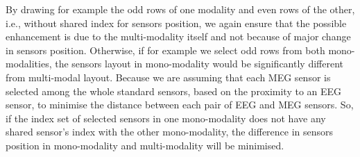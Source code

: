 By drawing for example the odd rows of one modality and even rows of the other, i.e., without shared index for sensors position, we again ensure that the possible enhancement is due to the multi-modality itself and not because of major change in sensors position.
Otherwise, if for example we select odd rows from both mono-modalities, the sensors layout in mono-modality would be significantly different from multi-modal layout.
Because we are assuming that each MEG sensor is selected among the whole standard sensors, based on the proximity to an EEG sensor, to minimise the distance between each pair of EEG and MEG sensors.
So, if the index set of selected sensors in one mono-modality does not have any shared sensor's index with the other mono-modality, the difference in sensors position in mono-modality and multi-modality will be minimised.